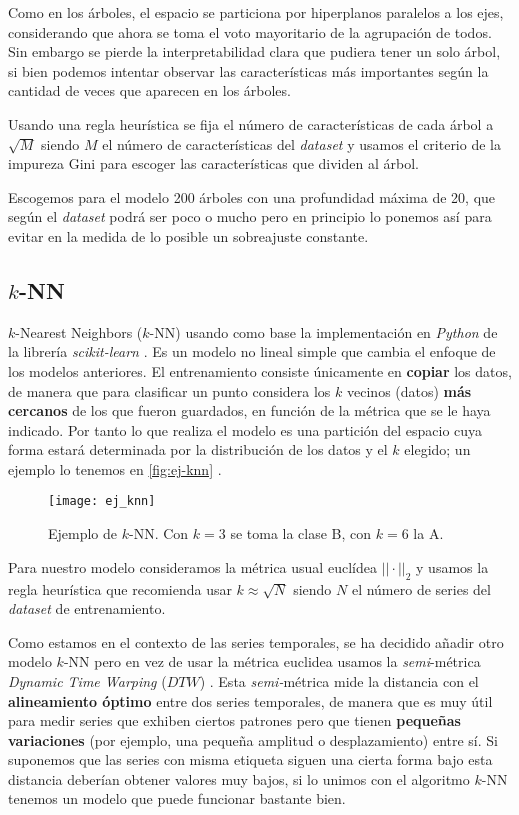 Como en los árboles, el espacio se particiona por hiperplanos paralelos a los ejes, considerando que ahora se toma el voto mayoritario de la agrupación de todos. Sin embargo se pierde la interpretabilidad clara que pudiera tener un solo árbol, si bien podemos intentar observar las características más importantes según la cantidad de veces que aparecen en los árboles.

Usando una regla heurística se fija el número de características de cada árbol a $\sqrt{M}$ siendo $M$ el número de características del \emph{dataset} y usamos el criterio de la impureza Gini \cite{rokach2005top} para escoger las características que dividen al árbol.

Escogemos para el modelo 200 árboles con una profundidad máxima de 20, que según el \emph{dataset} podrá ser poco o mucho pero en principio lo ponemos así para evitar en la medida de lo posible un sobreajuste constante.

\subsection{$k$-NN}

$k$-Nearest Neighbors ($k$-NN) \cite{cover1967nearest} usando como base la implementación en \emph{Python} de la librería \emph{scikit-learn} \cite{scikit2020knn}. Es un modelo no lineal simple que cambia el enfoque de los modelos anteriores. El entrenamiento consiste únicamente en \textbf{copiar} los datos, de manera que para clasificar un punto considera los $k$ vecinos (datos) \textbf{más cercanos} de los que fueron guardados, en función de la métrica que se le haya indicado. Por tanto lo que realiza el modelo es una partición del espacio cuya forma estará determinada por la distribución de los datos y el $k$ elegido; un ejemplo lo tenemos en \autoref{fig:ej-knn} \cite{sanjay2018knn}.

\begin{figure}[htbp]
  \centering
  \texttt{[image: ej\_knn]}
  \caption{Ejemplo de $k$-NN. Con $k=3$ se toma la clase B, con $k=6$ la A.}
  \label{fig:ej-knn}
\end{figure}

Para nuestro modelo consideramos la métrica usual euclídea $||\cdot||_2$ y usamos la regla heurística que recomienda usar $k \approx \sqrt{N}$ siendo $N$ el número de series del \emph{dataset} de entrenamiento.

Como estamos en el contexto de las series temporales, se ha decidido añadir otro modelo $k$-NN pero en vez de usar la métrica euclidea usamos la \emph{semi}-métrica \emph{Dynamic Time Warping} ($DTW$) \cite{berndt1994using}. Esta \emph{semi-}métrica \cite{jain2018semi} mide la distancia con el \textbf{alineamiento óptimo} entre dos series temporales, de manera que es muy útil para medir series que exhiben ciertos patrones pero que tienen \textbf{pequeñas variaciones} (por ejemplo, una pequeña amplitud o desplazamiento) entre sí. Si suponemos que las series con misma etiqueta siguen una cierta forma bajo esta distancia deberían obtener valores muy bajos, si lo unimos con el algoritmo $k$-NN tenemos un modelo que puede funcionar bastante bien.

